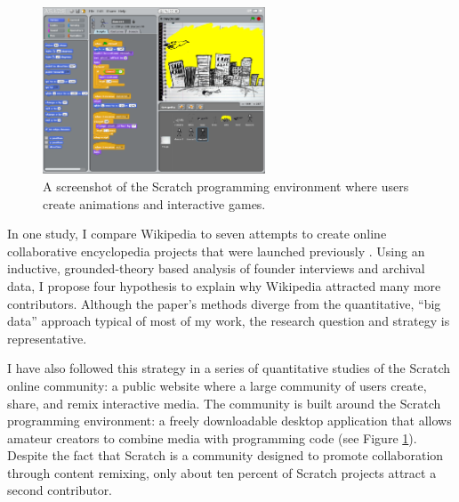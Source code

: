 \documentclass[10pt]{memoir}
\begin{document}

\begin{figure}
 \begin{centering}
 \includegraphics[width=2.6in]{figures/scratch_screenshot_default.png}
 \caption{A screenshot of the Scratch programming environment
   where users create animations and interactive games.}
 \label{fig:scratchapp}
 \end{centering}
 \vspace{-2em}
\end{figure}

In one study, I compare Wikipedia to seven attempts to create online
collaborative encyclopedia projects that were launched previously
\cite{hill_almost_2012}. Using an inductive, grounded-theory based
analysis of founder interviews and archival data, I propose four
hypothesis to explain why Wikipedia attracted many more
contributors. Although the paper's methods diverge from the
quantitative, ``big data'' approach typical of most of my work, the
research question and strategy is representative.

I have also followed this strategy in a series of quantitative
studies of the Scratch online community: a public website where a large
community of users create, share, and remix interactive media. The
community is built around the Scratch programming environment: a
freely downloadable desktop application that allows amateur creators
to combine media with programming code (see Figure
\ref{fig:scratchapp}). Despite the fact that Scratch is a community
designed to promote collaboration through content remixing, only about
ten percent of Scratch projects attract a second
contributor.
\end{document}
